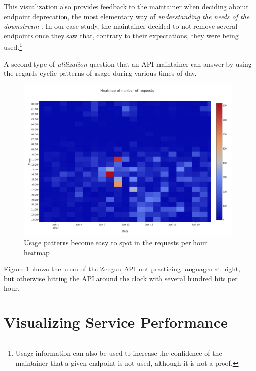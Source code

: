 \documentclass[conference]{IEEEtran}
\begin{document}
  This visualization also provides feedback to the maintainer when deciding aboiut endpoint deprecation, the most elementary way of {\em understanding the needs of the downstream} \cite{Haen14a}. In our case study, the maintainer decided to not remove several endpoints once they saw that, contrary to their expectations, they were being used.\footnote{Usage information can also be used to increase the confidence of the maintainer that a given endpoint is not used, although it is not a proof.}

  \niceseparator

  A second type of {\em utilization} question that an API maintainer can answer by using the \tool regards cyclic patterns of usage during various times of day. 


    \begin{figure}[!ht]
      \centering
      \includegraphics[width=\linewidth]{daily_patterns}
      \caption{Usage patterns become easy to spot in the requests per hour heatmap}
      \label{fig:dp}
    \end{figure}


  Figure \ref{fig:dp} shows the users of the Zeeguu API not practicing  languages at night, but otherwise hitting the API around the clock with several hundred hits per hour. 



\section{Visualizing Service Performance}
\end{document}
